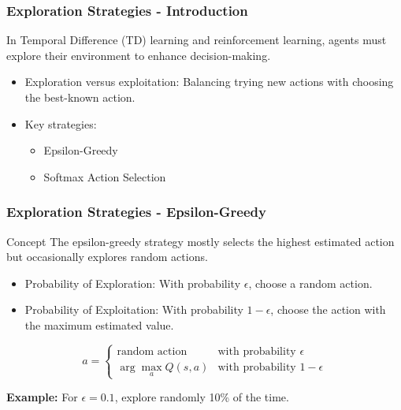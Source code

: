 \documentclass[aspectratio=169]{beamer}
\begin{document}
\begin{frame}[fragile]
    \frametitle{Exploration Strategies - Introduction}
    In Temporal Difference (TD) learning and reinforcement learning, agents must explore their environment to enhance decision-making. 
    \begin{itemize}
        \item Exploration versus exploitation: Balancing trying new actions with choosing the best-known action.
        \item Key strategies: 
            \begin{itemize}
                \item Epsilon-Greedy
                \item Softmax Action Selection
            \end{itemize}
    \end{itemize}
\end{frame}

\begin{frame}[fragile]
    \frametitle{Exploration Strategies - Epsilon-Greedy}
    \begin{block}{Concept}
        The epsilon-greedy strategy mostly selects the highest estimated action but occasionally explores random actions.
    \end{block}
    
    \begin{itemize}
        \item Probability of Exploration: With probability $\epsilon$, choose a random action.
        \item Probability of Exploitation: With probability $1 - \epsilon$, choose the action with the maximum estimated value.
    \end{itemize}

    \begin{equation}
    a = 
    \begin{cases} 
    \text{random action} & \text{with probability } \epsilon \\ 
    \arg\max_a Q(s, a) & \text{with probability } 1 - \epsilon 
    \end{cases}
    \end{equation}
    
    \textbf{Example:} For $\epsilon = 0.1$, explore randomly 10\% of the time.
\end{frame}
\end{document}
